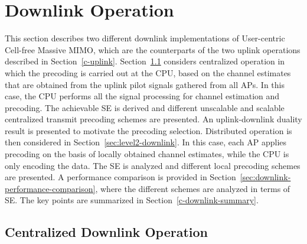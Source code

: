 
\chapter{Downlink Operation}
\label{c-downlink} 


This section describes two different downlink implementations of User-centric Cell-free Massive \gls{MIMO}, which are the counterparts of the two uplink operations described in Section~\ref{c-uplink}. Section~\ref{sec:level4-downlink} considers centralized operation in which the precoding is carried out at the CPU, 
based on the channel estimates that are obtained from the uplink pilot signals gathered from all APs. In this case, the CPU performs all the signal processing for channel estimation and precoding. The achievable SE is derived and different unscalable and scalable centralized transmit precoding schemes are presented. An uplink-downlink duality result is presented to motivate the precoding selection. 
Distributed operation is then considered in Section~\ref{sec:level2-downlink}. In this case, each AP applies precoding on the basis of locally obtained channel estimates, while the CPU is only encoding the data. The SE is analyzed and different local precoding schemes are presented. A performance comparison is provided in Section~\ref{sec:downlink-performance-comparison}, where the different schemes are analyzed in terms of SE.
The key points are summarized in Section~\ref{c-downlink-summary}.

\section{Centralized Downlink Operation}
\label{sec:level4-downlink}

